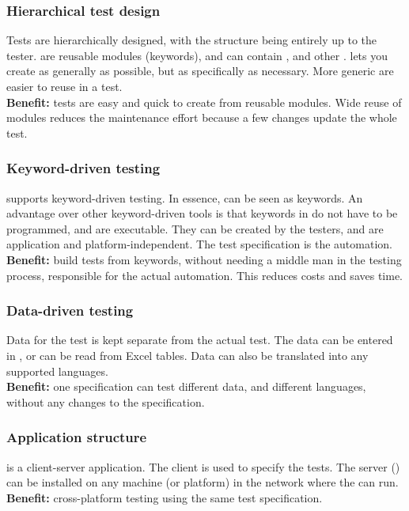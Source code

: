 \subsubsection{Hierarchical test design}
Tests are hierarchically designed, with the structure being entirely up to the tester. \gdcases{} are reusable modules (keywords), and can contain \gdsteps{}, and other \gdcases{}. \gd{} lets you create \gdcases{} as generally as possible, but as specifically as necessary. More generic \gdcases{} are easier to reuse in a test. \\
\textbf{Benefit:} tests are easy and quick to create from reusable modules. Wide reuse of modules reduces the maintenance effort because a few changes update the whole test.
 
\subsubsection{Keyword-driven testing}
\gd{} supports keyword-driven testing. In essence, \gdcases{} can be seen as keywords. An advantage over other keyword-driven tools is that keywords in \gd{} do not have to be programmed, and are executable. They can be created by the testers, and are application and platform-independent. The test specification is the automation. \\
\textbf{Benefit:} build tests from keywords, without needing a middle man in the testing process, responsible for the actual automation. This reduces costs and saves time. 

\subsubsection{Data-driven testing}
Data for the test is kept separate from the actual test. The data can be entered in \gd{}, or can be read from Excel tables. Data can also be translated into any \gdaut{} supported languages. \\
\textbf{Benefit:} one specification can test different data, and different languages, without any changes to the specification. 

\subsubsection{Application structure}
\gd{} is a client-server application. The client is used to specify the tests. The server (\gdserver{}) can be installed on any machine (or platform) in the network where the \gdaut{} can run. \\
\textbf{Benefit:} cross-platform testing using the same test specification.

